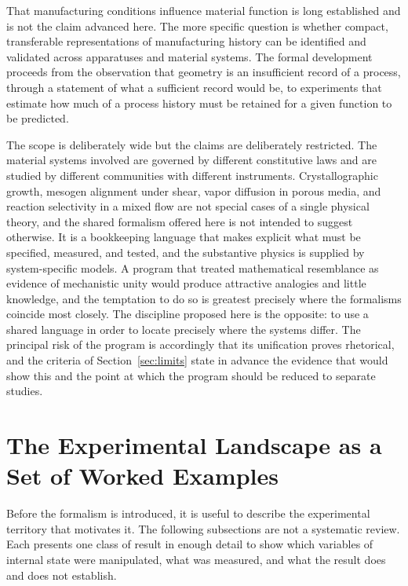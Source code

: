 \documentclass[11pt]{article}
\theoremstyle{definition}
\begin{document}
That manufacturing conditions influence material function is long established and is not the claim advanced here. The more specific question is whether compact, transferable representations of manufacturing history can be identified and validated across apparatuses and material systems. The formal development proceeds from the observation that geometry is an insufficient record of a process, through a statement of what a sufficient record would be, to experiments that estimate how much of a process history must be retained for a given function to be predicted.

The scope is deliberately wide but the claims are deliberately restricted. The material systems involved are governed by different constitutive laws and are studied by different communities with different instruments. Crystallographic growth, mesogen alignment under shear, vapor diffusion in porous media, and reaction selectivity in a mixed flow are not special cases of a single physical theory, and the shared formalism offered here is not intended to suggest otherwise. It is a bookkeeping language that makes explicit what must be specified, measured, and tested, and the substantive physics is supplied by system-specific models. A program that treated mathematical resemblance as evidence of mechanistic unity would produce attractive analogies and little knowledge, and the temptation to do so is greatest precisely where the formalisms coincide most closely. The discipline proposed here is the opposite: to use a shared language in order to locate precisely where the systems differ. The principal risk of the program is accordingly that its unification proves rhetorical, and the criteria of Section~\ref{sec:limits} state in advance the evidence that would show this and the point at which the program should be reduced to separate studies.

\section{The Experimental Landscape as a Set of Worked Examples}

Before the formalism is introduced, it is useful to describe the experimental territory that motivates it. The following subsections are not a systematic review. Each presents one class of result in enough detail to show which variables of internal state were manipulated, what was measured, and what the result does and does not establish.
\end{document}
